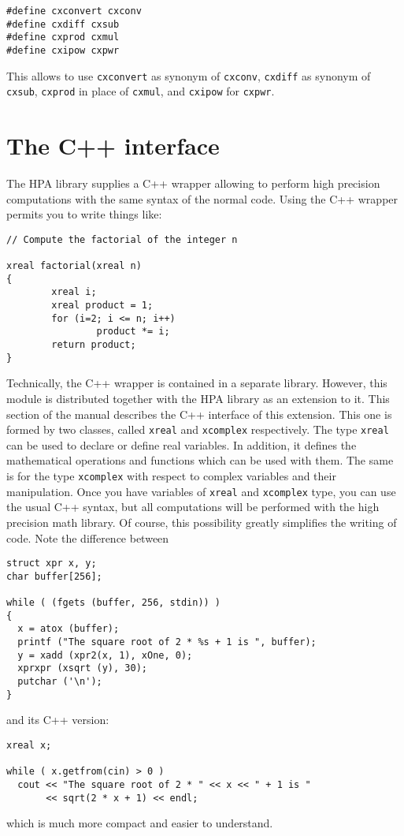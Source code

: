\documentclass{article}
\begin{document}
\begin{verbatim}
#define cxconvert cxconv
#define cxdiff cxsub
#define cxprod cxmul
#define cxipow cxpwr
\end{verbatim}
This allows to use \texttt{cxconvert} as synonym of \texttt{cxconv},
\texttt{cxdiff} as synonym of \texttt{cxsub}, \texttt{cxprod} in place
of \texttt{cxmul}, and \texttt{cxipow} for \texttt{cxpwr}.


\hypertarget{toc16}{}
\section{The C++ interface}
The HPA library supplies a C++ wrapper allowing to
perform high precision computations with the
same syntax of the normal code.
Using the C++ wrapper permits you to write things like:

\begin{verbatim}
// Compute the factorial of the integer n

xreal factorial(xreal n)
{
        xreal i;
        xreal product = 1;
        for (i=2; i <= n; i++)
                product *= i;
        return product;
}
\end{verbatim}
Technically, the C++ wrapper is contained in a separate
library. However, this module is distributed together
with the HPA library as an extension to it.
This section of the manual describes 
the C++ interface of this extension.
This one is formed by two classes, called \texttt{xreal}
and \texttt{xcomplex} respectively.
The type \texttt{xreal} can be used to declare or define
real variables. In addition, it defines the mathematical
operations and functions which can be used with them.
The same is for the type \texttt{xcomplex} with respect to
complex variables and their manipulation. 
Once you have variables of \texttt{xreal} and \texttt{xcomplex} type,
you can use the usual C++ syntax, but all computations 
will be performed with the high precision math library. 
Of course, this possibility
greatly simplifies the writing of code.
Note the difference between 

\begin{verbatim}
struct xpr x, y;
char buffer[256];

while ( (fgets (buffer, 256, stdin)) )
{
  x = atox (buffer);
  printf ("The square root of 2 * %s + 1 is ", buffer);
  y = xadd (xpr2(x, 1), xOne, 0);
  xprxpr (xsqrt (y), 30);
  putchar ('\n');
}
\end{verbatim}
and its C++ version:

\begin{verbatim}
xreal x;

while ( x.getfrom(cin) > 0 )
  cout << "The square root of 2 * " << x << " + 1 is " 
       << sqrt(2 * x + 1) << endl;
\end{verbatim}
which is much more compact and easier to understand.
\end{document}
